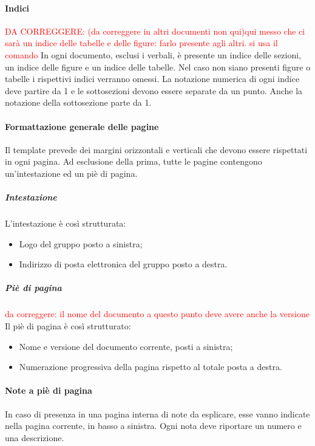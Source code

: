 		\paragraph{Indici} \Spazio
		\textcolor{red}{DA CORREGGERE: (da correggere in altri documenti non qui)qui messo che ci sarà un indice  delle tabelle e delle figure: farlo presente agli altri. si usa il comando}
		In ogni documento, esclusi i verbali, è presente un indice delle sezioni, un indice delle figure e un indice delle tabelle. Nel caso non siano presenti figure o tabelle i rispettivi indici verranno omessi. La notazione numerica di ogni indice deve partire da 1 e le sottosezioni devono essere separate da un punto. Anche la notazione della sottosezione parte da 1.
		
		\paragraph{Formattazione generale delle pagine} \Spazio
		Il template prevede dei margini orizzontali e verticali che devono essere rispettati in ogni pagina. Ad esclusione della prima, tutte le pagine contengono un’intestazione ed un piè di pagina. 
			
			\subparagraph{Intestazione} \Spazio
			L’intestazione è così strutturata:
			\begin{itemize}
				\item Logo del gruppo posto a sinistra;
				\item Indirizzo di posta elettronica del gruppo posto a destra.
			\end{itemize}
			
			\subparagraph{Piè di pagina} \Spazio
			\textcolor{red}{da correggere: il nome del documento a questo punto deve avere anche la versione}
			Il piè di pagina è così strutturato:
			\begin{itemize}
				\item Nome e versione del documento corrente, posti a sinistra;
				\item Numerazione progressiva della pagina rispetto al totale posta a destra.
			\end{itemize}
		
		\paragraph{Note a piè di pagina} \Spazio
		In caso di presenza in una pagina interna di note da esplicare, esse vanno indicate nella pagina corrente, in basso a sinistra. Ogni nota deve riportare un numero e una	descrizione.
		
